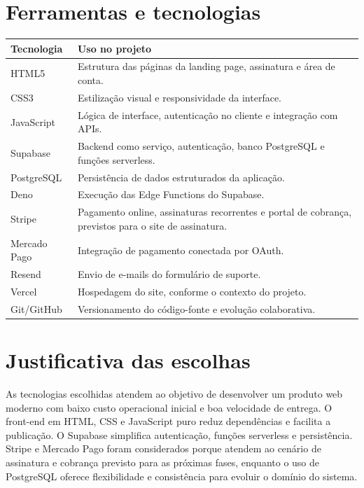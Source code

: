 \documentclass[
  12pt,
  openany,
  oneside,
  a4paper,
  brazil
]{abntex2}
\begin{document}
\section{Ferramentas e tecnologias}
\begin{longtable}{>{\raggedright\arraybackslash}p{3.6cm} >{\raggedright\arraybackslash}p{9.9cm}}
\toprule
\textbf{Tecnologia} & \textbf{Uso no projeto} \\
\midrule
HTML5 & Estrutura das p\'aginas da landing page, assinatura e \'area de conta. \\
CSS3 & Estiliza\c{c}\~ao visual e responsividade da interface. \\
JavaScript & L\'ogica de interface, autentica\c{c}\~ao no cliente e integra\c{c}\~ao com APIs. \\
Supabase & Backend como servi\c{c}o, autentica\c{c}\~ao, banco PostgreSQL e fun\c{c}\~oes serverless. \\
PostgreSQL & Persist\^encia de dados estruturados da aplica\c{c}\~ao. \\
Deno & Execu\c{c}\~ao das Edge Functions do Supabase. \\
Stripe & Pagamento online, assinaturas recorrentes e portal de cobran\c{c}a, previstos para o site de assinatura. \\
Mercado Pago & Integra\c{c}\~ao de pagamento conectada por OAuth. \\
Resend & Envio de e-mails do formul\'ario de suporte. \\
Vercel & Hospedagem do site, conforme o contexto do projeto. \\
Git/GitHub & Versionamento do c\'odigo-fonte e evolu\c{c}\~ao colaborativa. \\
\bottomrule
\end{longtable}

\section{Justificativa das escolhas}
As tecnologias escolhidas atendem ao objetivo de desenvolver um produto web moderno com baixo custo operacional inicial e boa velocidade de entrega. O front-end em HTML, CSS e JavaScript puro reduz depend\^encias e facilita a publica\c{c}\~ao. O Supabase simplifica autentica\c{c}\~ao, fun\c{c}\~oes serverless e persist\^encia. Stripe e Mercado Pago foram considerados porque atendem ao cen\'ario de assinatura e cobran\c{c}a previsto para as pr\'oximas fases, enquanto o uso de PostgreSQL oferece flexibilidade e consist\^encia para evoluir o dom\'inio do sistema.
\end{document}
